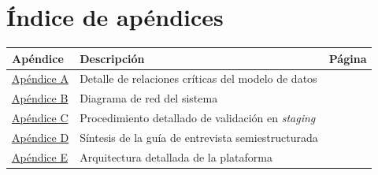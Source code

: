 \documentclass[12pt,letterpaper,oneside]{report}
\newif\iffastcompile
\begin{document}
\renewcommand{\thefigure}{\arabic{figure}}
\renewcommand{\thetable}{\arabic{table}}

\hypersetup{pageanchor=false}
\setcounter{page}{1}
\setcounter{tocdepth}{-1}
\pagestyle{empty}
\makeatletter
\let\ps@plain\ps@empty
\makeatother








\clearpage
\makeatletter
\let\ps@plain\ps@fancy
\makeatother
\pagestyle{fancy}
\hypersetup{pageanchor=true}
\setcounter{tocdepth}{3}
\setcounter{page}{1}

\iffastcompile
\else
  \begingroup
  \renewcommand{\numberline}[1]{}
  \tableofcontents
  \endgroup
  \listoffigures
  \listoftables
  \cleardoublepage
  \chapter*{Índice de apéndices}
  \begin{tabular}{@{}p{3.4cm}p{10.0cm}r@{}}
    \textbf{Apéndice} & \textbf{Descripción} & \textbf{Página}\\
    \midrule
    \hyperref[ap:A]{Apéndice A} & Detalle de relaciones críticas del modelo de datos & \pageref{ap:A}\\
    \hyperref[ap:B]{Apéndice B} & Diagrama de red del sistema & \pageref{ap:B}\\
    \hyperref[ap:C]{Apéndice C} & Procedimiento detallado de validación en \textit{staging} & \pageref{ap:C}\\
    \hyperref[ap:D]{Apéndice D} & Síntesis de la guía de entrevista semiestructurada & \pageref{ap:D}\\
    \hyperref[ap:E]{Apéndice E} & Arquitectura detallada de la plataforma & \pageref{ap:E}\\
  \end{tabular}
\fi

\cleardoublepage
{}
\setcounter{page}{1}
\end{document}
